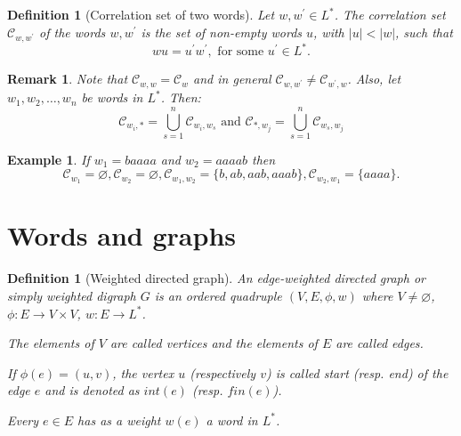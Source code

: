 \documentclass[12pt]{report}
\newtheorem*{remark}{Remark}
\newtheorem{defn}[mythm]{Definition}
\newtheorem{exa}[mythm]{Example}
\begin{document}
{\begin{defn}[Correlation set of two words]
Let $w, w^\prime \in L^*$. The {\em correlation set} $\mathcal{C}_{w, w^\prime}$ of the words $w, w^\prime$ is the set of non-empty words $u$, with $|u|<|w|$, such that
\[ w u = u^\prime w^\prime, \textrm{ for some $u^\prime \in L^*$.} \]
\end{defn}

\begin{remark} Note that $\mathcal{C}_{w,w} = \mathcal{C}_w$ and in general $\mathcal{C}_{w,w^\prime} \neq \mathcal{C}_{w^\prime,w}$. Also, let $w_1,w_2,\ldots,w_n$ be words in $L^*$. Then: \[\mathcal{C}_{w_i,*} = \bigcup\limits_{s=1}^n \mathcal{C}_{w_i,w_s}\text{ and } \mathcal{C}_{*,w_j} = \bigcup\limits_{s=1}^n \mathcal{C}_{w_s,w_j}\]
\end{remark}

\begin{exa} If $w_1 = baaaa$ and $w_2=aaaab$ then
\[\mathcal{C}_{w_1} = \varnothing , \mathcal{C}_{w_2} = \varnothing , \mathcal{C}_{w_1,w_2} =\{b,ab,aab,aaab\}, \mathcal{C}_{w_2,w_1}=\{aaaa\}.\] 
\end{exa}



\section{Words and graphs}

\begin{defn}[Weighted directed graph] An {\em edge-weighted directed graph} or simply {\em weighted digraph} $G$ is an ordered quadruple $(V,E,\phi,w)$ where $V \neq \varnothing$, $\phi : E \rightarrow V \times V$, $w: E \to L^*$. 

The elements of $V$ are called {\em vertices} and the elements of $E$ are called {\em edges}. 

If $\phi(e)=(u,v)$, the vertex $u$ (respectively $v$) is called {\em start} (resp. {\em end}) of the edge $e$ and is denoted as $int(e)$ (resp. $fin(e)$). 

Every $e \in E$ has as a weight $w(e)$ a word in $L^*$. 
\end{defn}



}
\end{document}

